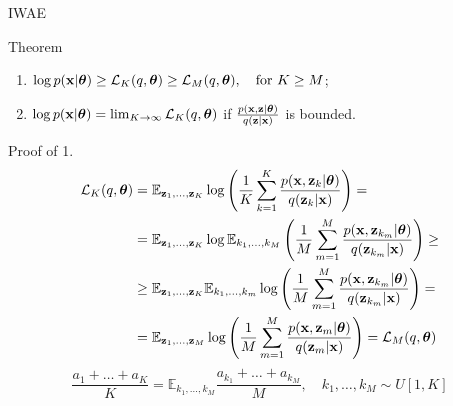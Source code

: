 
\begin{frame}{IWAE}
	\begin{block}{Theorem}
		\begin{enumerate}
			\item $\log p(\mathbf{x} | \boldsymbol{\theta}) \geq \mathcal{L}_K (q, \boldsymbol{\theta}) \geq \mathcal{L}_M (q, \boldsymbol{\theta}), \quad \text{for } K \geq M$;
			\item $\log p(\mathbf{x} | \boldsymbol{\theta}) = \lim_{K \rightarrow \infty} \mathcal{L}_K (q, \boldsymbol{\theta})$ if $\frac{p(\mathbf{x}, \mathbf{z} | \boldsymbol{\theta})}{q(\mathbf{z} | \mathbf{x})}$ is bounded.
		\end{enumerate}
		\vspace{-0.2cm}
	\end{block}
	\begin{block}{Proof of 1.}
		{ \footnotesize
			\vspace{-0.6cm}
			\begin{align*}
				\mathcal{L}_K (q, \boldsymbol{\theta}) &= \mathbb{E}_{\mathbf{z}_1, \dots, \mathbf{z}_K} \log \left( \frac{1}{K}\sum_{k=1}^K\frac{p(\mathbf{x}, \mathbf{z}_k | \boldsymbol{\theta})}{q(\mathbf{z}_k| \mathbf{x})} \right) = \\
				&= \mathbb{E}_{\mathbf{z}_1, \dots, \mathbf{z}_K} \log \mathbb{E}_{k_1, \dots, k_M} \left( \frac{1}{M}\sum_{m=1}^M\frac{p(\mathbf{x}, \mathbf{z}_{k_m} | \boldsymbol{\theta})}{q(\mathbf{z}_{k_m}| \mathbf{x})} \right) \geq \\
				&\geq \mathbb{E}_{\mathbf{z}_1, \dots, \mathbf{z}_K} \mathbb{E}_{k_1, \dots, k_m} \log \left( \frac{1}{M}\sum_{m=1}^M\frac{p(\mathbf{x}, \mathbf{z}_{k_m} | \boldsymbol{\theta})}{q(\mathbf{z}_{k_m}| \mathbf{x})} \right) = \\
				&= \mathbb{E}_{\mathbf{z}_1, \dots, \mathbf{z}_M} \log \left( \frac{1}{M}\sum_{m=1}^M\frac{p(\mathbf{x}, \mathbf{z}_m | \boldsymbol{\theta})}{q(\mathbf{z}_m| \mathbf{x})} \right) = \mathcal{L}_M (q, \boldsymbol{\theta})
			\end{align*}
			\[
			\frac{a_1 + \dots + a_K}{K} = \mathbb{E}_{k_1, \dots, k_M} \frac{a_{k_1} + \dots + a_{k_M}}{M}, \quad k_1, \dots, k_M \sim U[1, K]
			\]
		}
	\end{block}
	
\end{frame}
